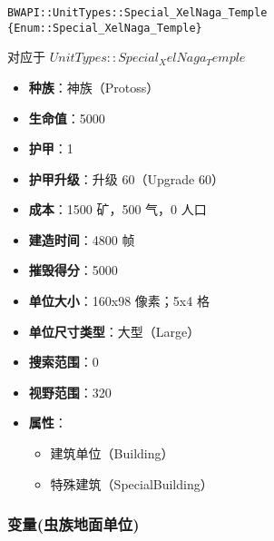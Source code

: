\begin{tcolorbox}[colback=white, colframe=black!60!white, title=Special\_XelNaga\_Temple(), arc=0mm]
    \begin{verbatim}
BWAPI::UnitTypes::Special_XelNaga_Temple {Enum::Special_XelNaga_Temple}
    \end{verbatim}
    对应于  $UnitTypes::Special_XelNaga_Temple$ 
    \begin{itemize}
        \item \textbf{种族}：神族（Protoss）
        \item \textbf{生命值}：5000
        \item \textbf{护甲}：1
        \item \textbf{护甲升级}：升级 60（Upgrade 60）
        \item \textbf{成本}：1500 矿，500 气，0 人口
        \item \textbf{建造时间}：4800 帧
        \item \textbf{摧毁得分}：5000
        \item \textbf{单位大小}：160x98 像素；5x4 格
        \item \textbf{单位尺寸类型}：大型（Large）
        \item \textbf{搜索范围}：0
        \item \textbf{视野范围}：320
        \item \textbf{属性}：
            \begin{itemize}
                \item 建筑单位（Building）
                \item 特殊建筑（SpecialBuilding）
            \end{itemize}
    \end{itemize}
\end{tcolorbox}

\subsubsection{变量(虫族地面单位)}

